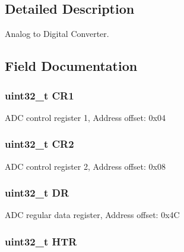 \subsection{Detailed Description}
Analog to Digital Converter. 

\subsection{Field Documentation}
\hypertarget{struct_a_d_c___type_def_ab0ec7102960640751d44e92ddac994f0}{
\subsubsection[{C\-R1}]{ uint32\-\_\-t C\-R1}}\label{struct_a_d_c___type_def_ab0ec7102960640751d44e92ddac994f0}
A\-D\-C control register 1, Address offset\-: 0x04 \hypertarget{struct_a_d_c___type_def_afdfa307571967afb1d97943e982b6586}{
\subsubsection[{C\-R2}]{ uint32\-\_\-t C\-R2}}\label{struct_a_d_c___type_def_afdfa307571967afb1d97943e982b6586}
A\-D\-C control register 2, Address offset\-: 0x08 \hypertarget{struct_a_d_c___type_def_a3df0d8dfcd1ec958659ffe21eb64fa94}{
\subsubsection[{D\-R}]{ uint32\-\_\-t D\-R}}\label{struct_a_d_c___type_def_a3df0d8dfcd1ec958659ffe21eb64fa94}
A\-D\-C regular data register, Address offset\-: 0x4\-C \hypertarget{struct_a_d_c___type_def_a24c3512abcc90ef75cf3e9145e5dbe9b}{
\subsubsection[{H\-T\-R}]{ uint32\-\_\-t H\-T\-R}}\label{struct_a_d_c___type_def_a24c3512abcc90ef75cf3e9145e5dbe9b}
